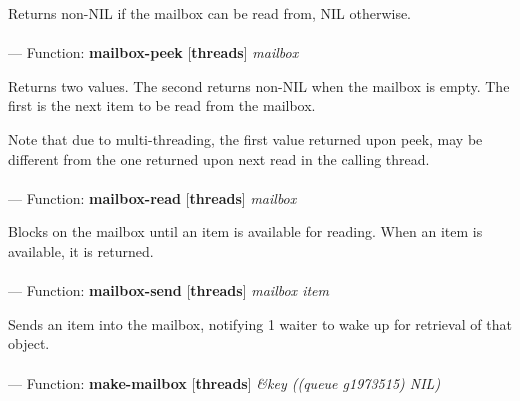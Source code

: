 \begin{adjustwidth}{5em}{5em}
Returns non-NIL if the mailbox can be read from, NIL otherwise.
\end{adjustwidth}

\paragraph{}
\label{THREADS:MAILBOX-PEEK}
--- Function: \textbf{mailbox-peek} [\textbf{threads}] \textit{mailbox}

\begin{adjustwidth}{5em}{5em}
Returns two values. The second returns non-NIL when the mailbox
is empty. The first is the next item to be read from the mailbox.

Note that due to multi-threading, the first value returned upon
peek, may be different from the one returned upon next read in the
calling thread.
\end{adjustwidth}

\paragraph{}
\label{THREADS:MAILBOX-READ}
--- Function: \textbf{mailbox-read} [\textbf{threads}] \textit{mailbox}

\begin{adjustwidth}{5em}{5em}
Blocks on the mailbox until an item is available for reading.
When an item is available, it is returned.
\end{adjustwidth}

\paragraph{}
\label{THREADS:MAILBOX-SEND}
--- Function: \textbf{mailbox-send} [\textbf{threads}] \textit{mailbox item}

\begin{adjustwidth}{5em}{5em}
Sends an item into the mailbox, notifying 1 waiter
to wake up for retrieval of that object.
\end{adjustwidth}

\paragraph{}
\label{THREADS:MAKE-MAILBOX}
--- Function: \textbf{make-mailbox} [\textbf{threads}] \textit{\&key ((queue g1973515) NIL)}

